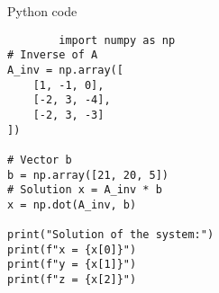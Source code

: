 \documentclass{beamer}
\begin{document}
\begin{frame}[fragile]{Python code}
    \begin{lstlisting}
        import numpy as np
# Inverse of A
A_inv = np.array([
    [1, -1, 0],
    [-2, 3, -4],
    [-2, 3, -3]
])

# Vector b
b = np.array([21, 20, 5])
# Solution x = A_inv * b
x = np.dot(A_inv, b)

print("Solution of the system:")
print(f"x = {x[0]}")
print(f"y = {x[1]}")
print(f"z = {x[2]}")
    \end{lstlisting}
\end{frame}
\end{document}
